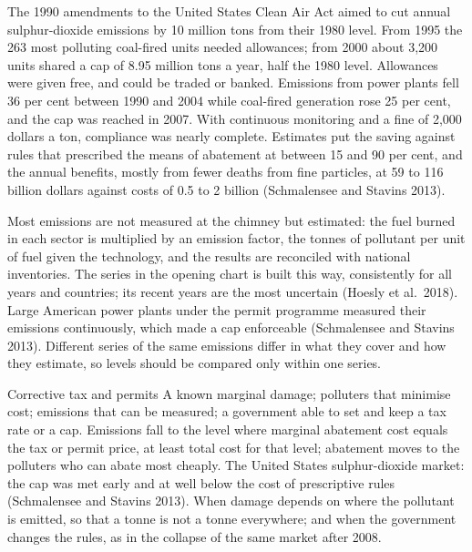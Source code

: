 \begin{record}[The sulphur-dioxide permit market]
The 1990 amendments to the United States Clean Air Act aimed to cut annual sulphur-dioxide emissions by 10 million tons from
their 1980 level. From 1995 the 263 most polluting coal-fired units needed allowances; from 2000 about 3{,}200 units shared a
cap of 8.95 million tons a year, half the 1980 level. Allowances were given free, and could be traded or banked. Emissions
from power plants fell 36 per cent between 1990 and 2004 while coal-fired generation rose 25 per cent, and the cap was reached
in 2007. With continuous monitoring and a fine of 2{,}000 dollars a ton, compliance was nearly complete. Estimates put the
saving against rules that prescribed the means of abatement at between 15 and 90 per cent, and the annual benefits, mostly
from fewer deaths from fine particles, at 59 to 116 billion dollars against costs of 0.5 to 2 billion (Schmalensee and Stavins
2013).
\end{record}

\begin{measure}
Most emissions are not measured at the chimney but estimated: the fuel burned in each sector is multiplied by an emission
factor, the tonnes of pollutant per unit of fuel given the technology, and the results are reconciled with national
inventories. The series in the opening chart is built this way, consistently for all years and countries; its recent
years are the most uncertain (Hoesly et al.\ 2018). Large American power plants under the permit programme measured their
emissions continuously, which made a cap enforceable (Schmalensee and Stavins 2013). Different series of the same
emissions differ in what they cover and how they estimate, so levels should be compared only within one series.
\end{measure}

\begin{model}{Corrective tax and permits}
\assumes A known marginal damage; polluters that minimise cost; emissions that can be measured; a government able to set
and keep a tax rate or a cap.
\predicts Emissions fall to the level where marginal abatement cost equals the tax or permit price, at least total cost
for that level; abatement moves to the polluters who can abate most cheaply.
\tested The United States sulphur-dioxide market: the cap was met early and at well below the cost of prescriptive rules
(Schmalensee and Stavins 2013).
\breaks When damage depends on where the pollutant is emitted, so that a tonne is not a tonne everywhere; and when the
government changes the rules, as in the collapse of the same market after 2008.
\end{model}

